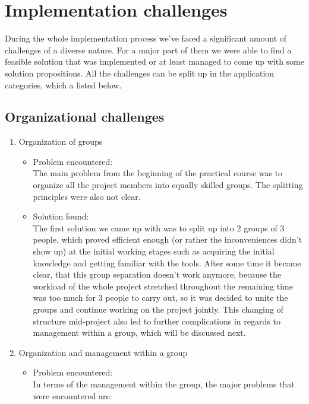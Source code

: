 \section{Implementation challenges}

During the whole implementation process we've faced a significant amount of challenges of a diverse nature. For a major part of them we were able to find a feasible solution that was implemented or at least managed to come up with some solution propositions. All the challenges can be split up in the application categories, which a listed below.

\subsection{Organizational challenges}

\begin{enumerate}
  \item Organization of groups
  \begin{itemize}
      \item Problem encountered:\\
      The main problem from the beginning of the practical course was to organize all the project members into equally skilled groups. The splitting principles were also not clear.
      \item Solution found:\\
      The first solution we came up with was to split up into 2 groups of 3 people, which proved efficient enough (or rather the inconveniences didn't show up) at the initial working stages such as acquiring the initial knowledge and getting familiar with the tools. After some time it became clear, that this group separation doesn't work anymore, because the workload of the whole project stretched throughout the remaining time was too much for 3 people to carry out, so it was decided to unite the groups and continue working on the project jointly. This changing of structure mid-project also led to further complications in regards to management within a group, which will be discussed next.
  \end{itemize}
  \item Organization and management within a group
   \begin{itemize}
      \item Problem encountered:\\
        In terms of the management within the group, the major problems that were encountered are: \\

\end{itemize}
\end{enumerate}
